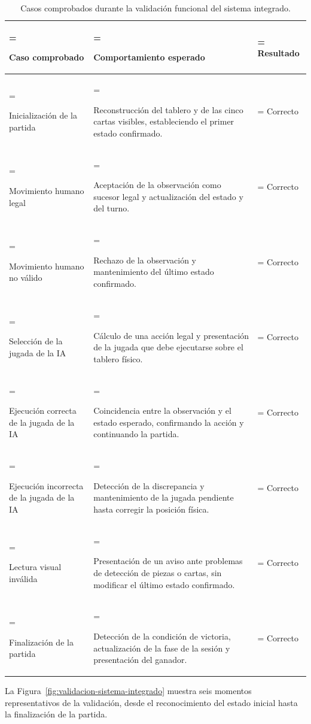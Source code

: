 \begin{table}[H]
\centering
\small
\setlength{\tabcolsep}{4pt}
\begin{tabularx}{\textwidth}{
>{\hsize=0.85\hsize\linewidth=\hsize\raggedright\arraybackslash}X
>{\hsize=1.60\hsize\linewidth=\hsize\raggedright\arraybackslash}X
>{\hsize=0.55\hsize\linewidth=\hsize\centering\arraybackslash}X
}
\hline
\textbf{Caso comprobado} & \textbf{Comportamiento esperado} & \textbf{Resultado} \\
\hline
Inicialización de la partida &
Reconstrucción del tablero y de las cinco cartas visibles, estableciendo el primer estado confirmado. &
Correcto \\
\hline
Movimiento humano legal &
Aceptación de la observación como sucesor legal y actualización del estado y del turno. &
Correcto \\
\hline
Movimiento humano no válido &
Rechazo de la observación y mantenimiento del último estado confirmado. &
Correcto \\
\hline
Selección de la jugada de la IA &
Cálculo de una acción legal y presentación de la jugada que debe ejecutarse sobre el tablero físico. &
Correcto \\
\hline
Ejecución correcta de la jugada de la IA &
Coincidencia entre la observación y el estado esperado, confirmando la acción y continuando la partida. &
Correcto \\
\hline
Ejecución incorrecta de la jugada de la IA &
Detección de la discrepancia y mantenimiento de la jugada pendiente hasta corregir la posición física. &
Correcto \\
\hline
Lectura visual inválida &
Presentación de un aviso ante problemas de detección de piezas o cartas, sin modificar el último estado confirmado. &
Correcto \\
\hline
Finalización de la partida &
Detección de la condición de victoria, actualización de la fase de la sesión y presentación del ganador. &
Correcto \\
\hline
\end{tabularx}
\caption{Casos comprobados durante la validación funcional del sistema integrado.}
\label{tab:validacion-funcional}
\end{table}

La Figura~\ref{fig:validacion-sistema-integrado} muestra seis momentos representativos de la validación, desde el reconocimiento del estado inicial hasta la finalización de la partida.


